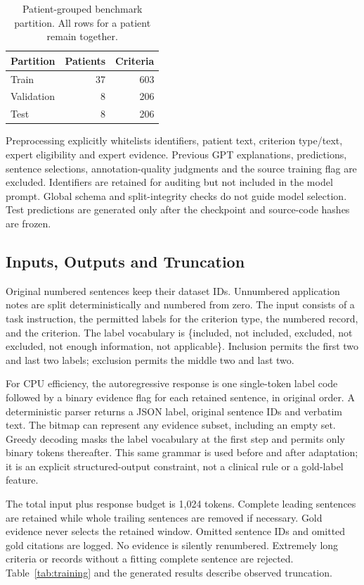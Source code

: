 \documentclass[conference]{IEEEtran}
\begin{document}
\begin{table}[t]\centering
\caption{Patient-grouped benchmark partition. All rows for a patient remain together.}\label{tab:split}
\begin{tabular}{lrr}\toprule Partition & Patients & Criteria\\\midrule
Train & 37 & 603\\ Validation & 8 & 206\\ Test & 8 & 206\\\bottomrule\end{tabular}
\end{table}

Preprocessing explicitly whitelists identifiers, patient text, criterion type/text, expert eligibility and expert evidence. Previous GPT explanations, predictions, sentence selections, annotation-quality judgments and the source training flag are excluded. Identifiers are retained for auditing but not included in the model prompt. Global schema and split-integrity checks do not guide model selection. Test predictions are generated only after the checkpoint and source-code hashes are frozen.

\subsection{Inputs, Outputs and Truncation}
Original numbered sentences keep their dataset IDs. Unnumbered application notes are split deterministically and numbered from zero. The input consists of a task instruction, the permitted labels for the criterion type, the numbered record, and the criterion. The label vocabulary is
\{included, not included, excluded, not excluded, not enough information, not applicable\}. Inclusion permits the first two and last two labels; exclusion permits the middle two and last two.

For CPU efficiency, the autoregressive response is one single-token label code followed by a binary evidence flag for each retained sentence, in original order. A deterministic parser returns a JSON label, original sentence IDs and verbatim text. The bitmap can represent any evidence subset, including an empty set. Greedy decoding masks the label vocabulary at the first step and permits only binary tokens thereafter. This same grammar is used before and after adaptation; it is an explicit structured-output constraint, not a clinical rule or a gold-label feature.

The total input plus response budget is 1,024 tokens. Complete leading sentences are retained while whole trailing sentences are removed if necessary. Gold evidence never selects the retained window. Omitted sentence IDs and omitted gold citations are logged. No evidence is silently renumbered. Extremely long criteria or records without a fitting complete sentence are rejected. Table~\ref{tab:training} and the generated results describe observed truncation.
\end{document}
